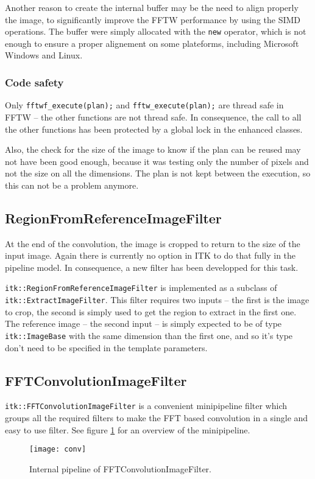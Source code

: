 \documentclass{InsightArticle}
\begin{document}
Another reason to create the internal buffer may be the need to align properly the image, to significantly
improve the FFTW performance by using the SIMD operations. The buffer were simply allocated with the
\verb$new$ operator, which is not enough to ensure a proper alignement
on some plateforms, including Microsoft Windows and Linux.


\subsubsection{Code safety}

Only \verb$fftwf_execute(plan);$ and \verb$fftw_execute(plan);$ are thread safe in FFTW -- the other functions
are not thread safe. In consequence, the call to all the other functions has been protected by a 
global lock in the enhanced classes.

Also, the check for the size of the image to know if the plan can be reused may not have been good 
enough, because it was testing only the number of pixels and not the size on all the dimensions. 
The plan is not kept between the execution, so this can not be a problem anymore.

\subsection{RegionFromReferenceImageFilter}

At the end of the convolution, the image is cropped to return to the size of the input image. Again
there is currently no option in ITK to do that fully in the pipeline model. In consequence, a new
filter has been developped for this task.

\verb$itk::RegionFromReferenceImageFilter$ is implemented as a subclass of \verb$itk::ExtractImageFilter$.
This filter requires two inputs -- the first is the image to crop, the second is simply used to get 
the region to extract in the first one. The reference image -- the second input -- is simply expected to
be of type \verb$itk::ImageBase$ with the same dimension than the first one, and so it's type don't
need to be specified in the template parameters.

\subsection{FFTConvolutionImageFilter}

\verb$itk::FFTConvolutionImageFilter$ is a convenient minipipeline filter which groups all the required
filters to make the FFT based convolution in a single and easy to use filter. See figure \ref{fig:conv-pipeline}
for an overview of the minipipeline.
\begin{figure}[htbp]
\centering
\texttt{[image: conv]}
\caption{Internal pipeline of FFTConvolutionImageFilter.\label{fig:conv-pipeline}}
\end{figure}
\end{document}
